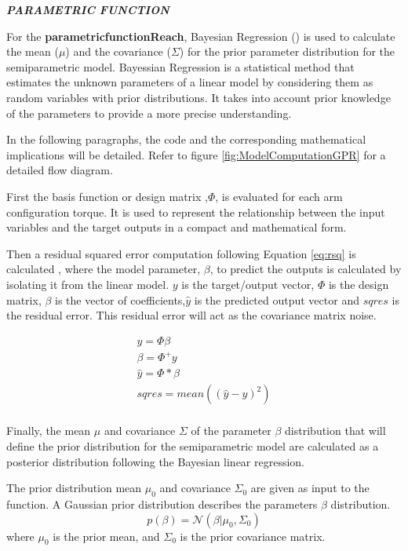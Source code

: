 \textbf{\textit{PARAMETRIC FUNCTION}}

For the \textbf{parametricfunctionReach}, Bayesian Regression (\cite{BLM}) is used to calculate the mean ($\mu$) and the covariance ($\Sigma$) for the prior parameter distribution for the semiparametric model. Bayessian Regression is a statistical method that estimates the unknown parameters of a linear model by considering them as random variables with prior distributions. It takes into account prior knowledge of the parameters to provide a more precise understanding.

In the following paragraphs, the code and the corresponding mathematical implications will be detailed.  Refer to figure \ref{fig:ModelComputationGPR} for a detailed flow diagram.

First the basis function or design matrix ,$\Phi$, is evaluated for each arm configuration torque. It is used to represent the relationship between the input variables and the target outputs in a compact and mathematical form. 

Then a residual squared error computation following Equation \ref{eq:rsq} is calculated , where the model parameter, $\beta$, to predict the outputs is calculated by isolating it from the linear model. \( y \) is the target/output vector, \( \Phi \) is the design matrix, \( \beta \) is the vector of coefficients,\( \hat{y} \) is the predicted output vector and  \( sqres \) is the residual error. This residual error will act as the covariance matrix noise.

\begin{equation}
\begin{aligned}
    y = \Phi \beta \\
    \beta = \Phi^+y \\
    \hat{y} = \Phi*\beta \\
    sqres = mean((\hat{y}-y)^2) \\
\end{aligned}
\end{equation} \label{eq:rsq}

Finally, the mean \( \mu \) and covariance \( \Sigma \) of the parameter $\beta$ distribution  that will define the prior distribution for the semiparametric model are calculated as a posterior distribution following the Bayesian linear regression.  

The prior distribution mean \( \mu_0 \) and covariance \( \Sigma_0 \) are given as input to the function. A Gaussian prior distribution describes the parameters \( \beta \) distribution.
\begin{equation}
  p(\beta) = \mathcal{N}(\beta | \mu_0, \Sigma_0)
\end{equation}
where \( \mu_0 \) is the prior mean, and \( \Sigma_0 \) is the prior covariance matrix.


